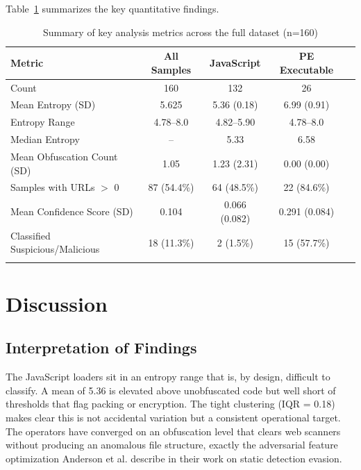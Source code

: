 \documentclass[pdflatex,sn-mathphys-num]{sn-jnl}
\theoremstyle{thmstyleone}%
\theoremstyle{thmstyletwo}%
\theoremstyle{thmstylethree}%
\begin{document}
Table~\ref{tab:summary} summarizes the key quantitative findings.

\begin{table}[h]
\caption{Summary of key analysis metrics across the full dataset (n=160)}\label{tab:summary}
\begin{tabular*}{\textwidth}{@{\extracolsep\fill}lcccc}
\toprule
Metric & All Samples & JavaScript & PE Executable \\
\midrule
Count & 160 & 132 & 26 \\
Mean Entropy (SD) & 5.625 & 5.36 (0.18) & 6.99 (0.91) \\
Entropy Range & 4.78--8.0 & 4.82--5.90 & 4.78--8.0 \\
Median Entropy & -- & 5.33 & 6.58 \\
Mean Obfuscation Count (SD) & 1.05 & 1.23 (2.31) & 0.00 (0.00) \\
Samples with URLs $>$ 0 & 87 (54.4\%) & 64 (48.5\%) & 22 (84.6\%) \\
Mean Confidence Score (SD) & 0.104 & 0.066 (0.082) & 0.291 (0.084) \\
Classified Suspicious/Malicious & 18 (11.3\%) & 2 (1.5\%) & 15 (57.7\%) \\
\botrule
\end{tabular*}
\end{table}


\section{Discussion}\label{sec:discussion}

\subsection{Interpretation of Findings}\label{subsec:interpretation}

The JavaScript loaders sit in an entropy range that is, by design, difficult to classify. A mean of 5.36 is elevated above unobfuscated code but well short of thresholds that flag packing or encryption. The tight clustering (IQR = 0.18) makes clear this is not accidental variation but a consistent operational target. The operators have converged on an obfuscation level that clears web scanners without producing an anomalous file structure, exactly the adversarial feature optimization Anderson et al. \cite{anderson2018} describe in their work on static detection evasion.
\end{document}
